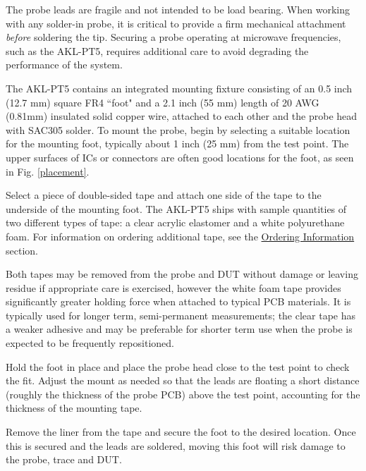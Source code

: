 \documentclass[11pt]{article}
\begin{document}
The probe leads are fragile and not intended to be load bearing. When working with any solder-in probe, it is critical
to provide a firm mechanical attachment \emph{before} soldering the tip. Securing a probe operating at microwave
frequencies, such as the AKL-PT5, requires additional care to avoid degrading the performance of the system.

The AKL-PT5 contains an integrated mounting fixture consisting of an 0.5 inch (12.7 mm) square FR4 ``foot" and a 2.1
inch (55 mm) length of 20 AWG (0.81mm) insulated solid copper wire, attached to each other and the probe head with
SAC305 solder. To mount the probe, begin by selecting a suitable location for the mounting foot, typically about 1 inch
(25 mm) from the test point. The upper surfaces of ICs or connectors are often good locations for the foot, as seen in
Fig. \ref{placement}.

Select a piece of double-sided tape and attach one side of the tape to the underside of the mounting foot. The AKL-PT5
ships with sample quantities of two different types of tape: a clear acrylic elastomer and a white polyurethane foam.
For information on ordering additional tape, see the \hyperref[ordering-info]{Ordering Information} section.

Both tapes may be removed from the probe and DUT without damage or leaving residue if appropriate care is exercised,
however the white foam tape provides significantly greater holding force when attached to typical PCB materials. It is
typically used for longer term, semi-permanent measurements; the clear tape has a weaker adhesive and may be preferable
for shorter term use when the probe is expected to be frequently repositioned.

Hold the foot in place and place the probe head close to the test point to check the fit. Adjust the mount as needed so
that the leads are floating a short distance (roughly the thickness of the probe PCB) above the test point, accounting
for the thickness of the mounting tape.

Remove the liner from the tape and secure the foot to the desired location. Once this is secured and the leads are 
soldered, moving this foot will risk damage to the probe, trace and DUT.
\end{document}
